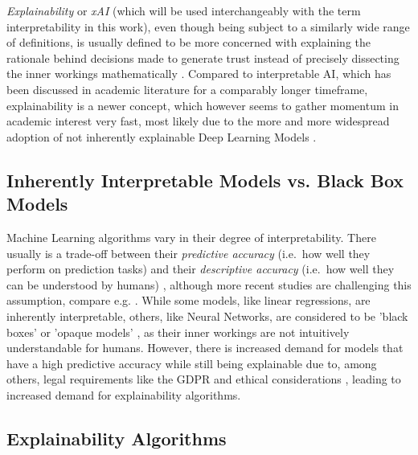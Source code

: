 \textit{Explainability} or \textit{xAI} (which will be used interchangeably with the term interpretability in this work), even though being subject to a similarly wide range of definitions, is usually defined to be more concerned with explaining the rationale behind decisions made to generate trust instead of precisely dissecting the inner workings mathematically \parencite{Gunning2019}. 
Compared to interpretable AI, which has been discussed in academic literature for a comparably longer timeframe, explainability is a newer concept, which however seems to gather momentum in academic interest very fast, most likely due to the more and more widespread adoption of not inherently explainable Deep Learning Models \parencite{BarredoArrieta2020}.


\subsection{Inherently Interpretable Models vs. Black Box Models}\label{subsec:inherently}

Machine Learning algorithms vary in their degree of interpretability. There usually is a trade-off between their \textit{predictive accuracy} (i.e.\ how well they perform on prediction tasks) and their \textit{descriptive accuracy} (i.e.\ how well they can be understood by humans) \parencite{Murdoch2019}, although more recent studies are challenging this assumption, compare e.g. \cite{Cooper2024}.
While some models, like linear regressions, are inherently interpretable, others, like Neural Networks, are considered to be 'black boxes' \parencite{Guidotti2018} or 'opaque models' \parencite{Burrell2016}, as their inner workings are not intuitively understandable for humans.
However, there is increased demand for models that have a high predictive accuracy while still being explainable due to, among others, legal requirements like the GDPR \parencite{GDPR} and ethical considerations \parencite{Guidotti2018}, leading to increased demand for explainability algorithms.

\subsection{Explainability Algorithms}\label{subsec:algorithms}


